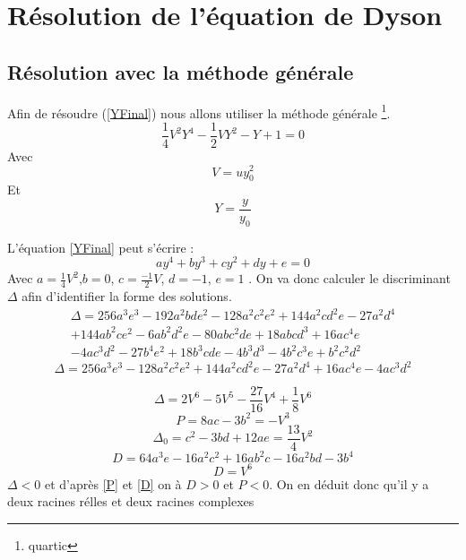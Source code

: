 \documentclass[12pt]{article}
\begin{document}
\section{R\'esolution de l'\'equation de Dyson}
\subsection{R\'esolution avec la m\'ethode g\'en\'erale}
Afin de r\'esoudre (\ref{YFinal}) nous allons utiliser la m\'ethode g\'en\'erale \footnote{quartic}.
\begin{equation}
\label{YFinal}
 \frac{1}{4} V ^2 Y^4 - \frac{1}{2} V Y^2 -Y + 1 = 0
\end{equation}
Avec 
\begin{equation}
 V = u y_0^2
\end{equation}
Et 
\begin{equation}
 Y = \frac{y}{y_0}
\end{equation}

L'\'equation \ref{YFinal} peut s'\'ecrire :
\begin{equation}
 a y^4 + b y^3 + c y^2 + d y + e = 0
\end{equation}
Avec $a = \frac{1}{4}V^2$,$b = 0$, $c=\frac{-1}{2}V$, $d = -1$, $e=1$ .
\newline
On va donc calculer le discriminant $\Delta$ afin d'identifier la forme des solutions.
\begin{align*}
\label{Delta}
 \Delta = 256a^3 e^3 - 192 a^2bde^2 - 128 a^2 c^2 e^2 + 144a^2cd^2e - 27a^2d^4\\ 
 + 144 ab^2ce^2 - 6ab^2d^2e - 80abc^2de + 18abcd^3 + 16ac^4e\\
 -4ac^3d^2-27b^4e^2+18b^3cde - 4b^3d^3 - 4b^2c^3e+b^2c^2d^2
 \end{align*}
\begin{equation}
 \Delta = 256a^3 e^3 - 128 a^2 c^2 e^2 + 144a^2cd^2e - 27a^2d^4 + 16ac^4e -4ac^3d^2
\end{equation}

\begin{equation}
 \Delta = 2V^6 - 5V^5 - \frac{27}{16} V^4 + \frac{1}{8}V^6
\end{equation}
\begin{equation}
\label{P}
 P = 8ac - 3b^2 = -V^3
\end{equation}
\begin{equation}
 \Delta_0 = c^2-3bd + 12ae = \frac{13}{4}V^2
\end{equation}
\begin{equation}
 D = 64a^3e -16a^2c^2 + 16ab^2c - 16a^2bd -3b^4
\end{equation}
\begin{equation}
\label{D}
 D = V^6
\end{equation}
$\Delta < 0$ et d'apr\`es \ref{P} et \ref{D} on \`a $ D>0$ et $P<0$.
On en d\'eduit donc qu'il y a deux racines r\'elles et deux racines complexes
\end{document}
